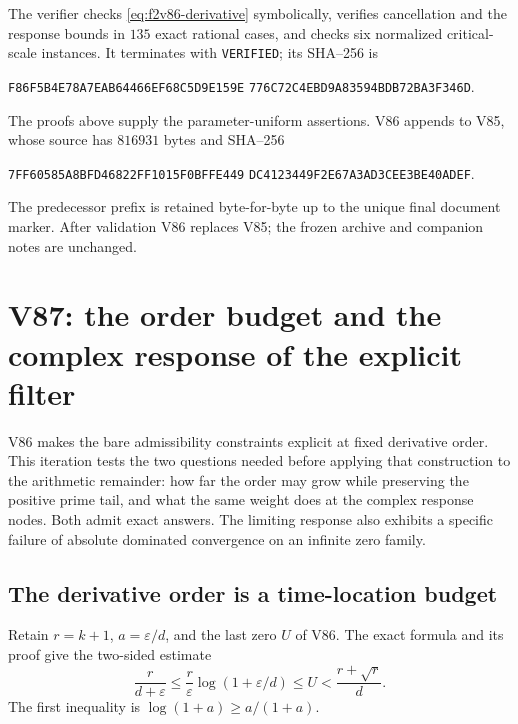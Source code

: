 \documentclass[11pt]{article}
\theoremstyle{definition}
\theoremstyle{remark}
\begin{document}
The verifier  checks
\eqref{eq:f2v86-derivative} symbolically, verifies cancellation and
the response bounds in \(135\) exact rational cases, and checks six
normalized critical-scale instances.  It terminates with
\texttt{VERIFIED}; its SHA--256 is
\begin{center}
\texttt{F86F5B4E78A7EAB64466EF68C5D9E159E}\allowbreak
\texttt{776C72C4EBD9A83594BDB72BA3F346D}.
\end{center}
The proofs above supply the parameter-uniform assertions.  V86 appends
to V85, whose source has \(816931\) bytes and SHA--256
\begin{center}
\texttt{7FF60585A8BFD46822FF1015F0BFFE449}\allowbreak
\texttt{DC4123449F2E67A3AD3CEE3BE40ADEF}.
\end{center}
The predecessor prefix is retained byte-for-byte up to the unique final
document marker.  After validation V86 replaces V85; the frozen archive
and companion notes are unchanged.
\endgroup


\clearpage
\section{V87: the order budget and the complex response of the explicit filter}
\label{sec:f2v87-order-response}
\begingroup
\setcounter{equation}{0}
\renewcommand{\theequation}{N87.\arabic{equation}}
\renewcommand{\theHequation}{f2v87.\arabic{equation}}

V86 makes the bare admissibility constraints explicit at fixed derivative
order.  This iteration tests the two questions needed before applying
that construction to the arithmetic remainder: how far the order may
grow while preserving the positive prime tail, and what the same weight
does at the complex response nodes.  Both admit exact answers.  The
limiting response also exhibits a specific failure of absolute dominated
convergence on an infinite zero family.

\subsection{The derivative order is a time-location budget}

Retain \(r=k+1\), \(a=\varepsilon/d\), and the last zero \(U\) of
V86.  The exact formula and its proof give the two-sided estimate
\begin{equation}
 \frac{r}{d+\varepsilon}\le
 \frac{r}{\varepsilon}\log(1+\varepsilon/d)
 \le U<\frac{r+\sqrt r}{d}.
 \label{eq:f2v87-order-sandwich}
\end{equation}
The first inequality is \(\log(1+a)\ge a/(1+a)\).
\end{document}

